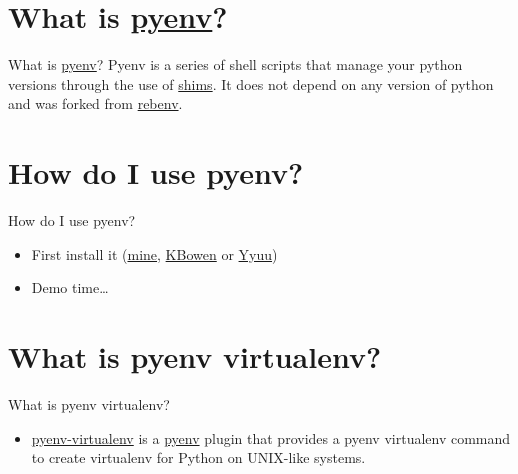 \documentclass[bigger]{beamer}
\begin{document}
\section{What is \href{https://github.com/yyuu/pyenv}{pyenv}?}
\label{sec-4}
\begin{frame}[label=sec-4-1]{What is \href{https://github.com/yyuu/pyenv}{pyenv}?}
Pyenv is a series of shell scripts that manage your python versions
through the use of \href{https://github.com/yyuu/pyenv#understanding-shims}{shims}. It does not depend on any version of
python and was forked from \href{https://github.com/sstephenson/rbenv}{rebenv}.
\end{frame}
\section{How do I use pyenv?}
\label{sec-5}
\begin{frame}[label=sec-5-1]{How do I use pyenv?}
\begin{itemize}
\item First install it (\href{http://mofj.commons.gc.cuny.edu/2014/01/20/ubuntu-set-up-a-virtual-environment-with-ipython-numpy-and-pandas/}{mine}, \href{http://askubuntu.com/questions/333109/upgrading-to-python-2-7-5-on-ubuntu-12-04}{KBowen} or \href{https://github.com/yyuu/pyenv#basic-github-checkout}{Yyuu})
\item Demo time\ldots{}
\end{itemize}
\end{frame}
\section{What is pyenv virtualenv?}
\label{sec-6}
\begin{frame}[label=sec-6-1]{What is pyenv virtualenv?}
\begin{itemize}
\item \href{https://github.com/yyuu/pyenv-virtualenv}{pyenv-virtualenv} is a \href{https://github.com/yyuu/pyenv}{pyenv} plugin that provides a 
pyenv virtualenv command to create virtualenv for 
Python on UNIX-like systems.
\end{itemize}
\end{frame}
\end{document}
